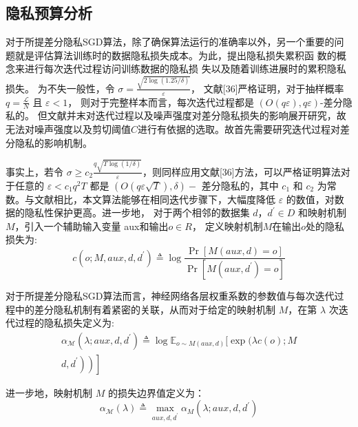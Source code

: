 \subsection{隐私预算分析}
对于所提差分隐私SGD算法，除了确保算法运行的准确率以外，另一个重要的问题就是评估算法训练时的数据隐私损失成本。为此，提出隐私损失累积函 数的概念来进行每次迭代过程访问训练数据的隐私损 失以及随着训练进展时的累积隐私损失。
为不失一般性，令 $\sigma=\frac{\sqrt{2 \log (1.25 / \delta)}}{\varepsilon}$， 文献[36]严格证明，对于抽样概率 $q=\frac{\mathcal{L}}{N}$ 且 $\varepsilon<1$， 则对于完整样本而言，每次迭代过程都是 $(O(q \varepsilon),q \varepsilon)$-差分隐私的。 但文献并末对迭代过程以及噪声强度对差分隐私损失的影响展开研究，故无法对噪声强度以及剪切阈值$C$进行有依据的选取。故首先需要研究迭代过程对差分隐私的影响机制。

事实上，若令 $\sigma \geqslant c_{2} \frac{q \sqrt{T \log (1 / \delta)}}{\varepsilon}$，则同样应用文献[36]方法，可以严格证明算法对于任意的 $\varepsilon<c_{1} q^{2} T$ 都是 $(O(q \varepsilon \sqrt{T}),\delta)-$ 差分隐私的，其中 $c_{1}$ 和 $c_{2}$ 为常数。与文献相比，本文算法能够在相同迭代步骤下，大幅度降低 $\varepsilon$ 的数值，对数据的隐私性保护更高。进一步地， 对于两个相邻的数据集 $d$，$d^{\prime} \in D$ 和映射机制 $M$，引入一个辅助输入变量 aux和输出$o \in R$， 定义映射机制$M$在输出$o$处的隐私损失为:
\begin{equation}
c\left(o ; M, a u x, d, d^{\prime}\right) \triangleq \log \frac{\operatorname{Pr}[M(a u x, d)=o]}{\operatorname{Pr}\left[M\left(a u x, d^{\prime}\right)=o\right]}
\end{equation}

对于所提差分隐私SGD算法而言，神经网络各层权重系数的参数值与每次迭代过程中的差分隐私机制有着紧密的关联，从而对于给定的映射机制 $M$，在第 $\lambda$ 次迭代过程的隐私损失定义为:
\begin{equation}\label{eq:隐私损失定义}
\begin{array}{r}
\alpha_{\mathcal{M}}\left(\lambda ; a u x, d, d^{\prime}\right) \triangleq \log \mathbb{E}_{o \sim M(a u x, d)}[\exp (\lambda c(o) ; M \\
\left.\left.\left.d,d^{\prime}\right)\right)\right]
\end{array}
\end{equation}

进一步地，映射机制 $M$ 的损失边界值定义为：
\begin{equation}\label{eq:损失边界值定义}
\alpha_{\mathcal{M}}(\lambda) \triangleq \max _{a u x, d, d^{\prime}} \alpha_{M}\left(\lambda ; a u x, d, d^{\prime}\right)
\end{equation}

